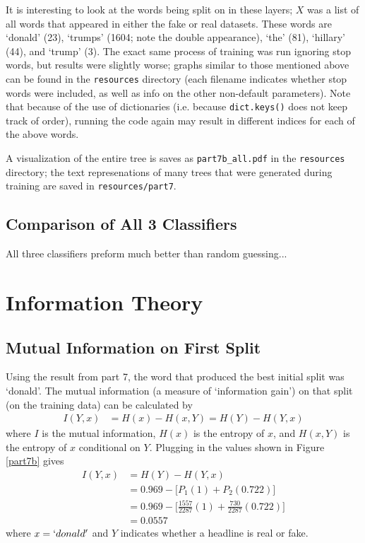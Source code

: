 \documentclass{article}
\begin{document}
   It is interesting to look at the words being split on in these layers; $X$ was a list of all words
   that appeared in either the fake or real datasets. These words are `donald' (23), `trumps' (1604; note the
   double appearance), `the' (81), `hillary' (44), and `trump' (3). The exact same process of training was run
   ignoring stop words, but results were slightly worse; graphs similar to those mentioned above can be found
   in the \texttt{resources} directory (each filename indicates whether stop words were included, as well as info
   on the other non-default parameters). Note that because of the use of dictionaries (i.e. because
   \texttt{dict.keys()} does not keep track of order), running the code again may result in different indices
   for each of the above words.


   A visualization of the entire tree is saves as \texttt{part7b\_all.pdf}
   in the \texttt{resources} directory; the text represenations of many trees that were generated during
   training are saved in \texttt{resources/part7}.

   \subsection{Comparison of All 3 Classifiers}
   All three classifiers preform much better than random guessing...


   \section{Information Theory}
   \subsection{Mutual Information on First Split}
   Using the result from part 7, the word that produced the best initial split was `donald'. The mutual information
   (a measure of `information gain') on that split (on the training data) can be calculated by
   \begin{equation*} \begin{split}
      I(Y, x)  &= H(x) - H(x, Y) = H(Y) - H(Y,x)
   \end{split} \end{equation*}
   where $I$ is the mutual information, $H(x)$ is the entropy of $x$, and $H(x, Y)$ is the entropy of $x$ conditional
   on $Y$.
   Plugging in the values shown in Figure \ref{part7b} gives
   \begin{equation*} \begin{split}
      I(Y, x)  &= H(Y) - H(Y,x) \\
               &= 0.969 - \bigg[ P_1 (1) + P_2 (0.722)  \bigg] \\
               &= 0.969 - \bigg[ \frac{1557}{2287} (1) + \frac{730}{2287} (0.722)  \bigg] \\
               &= 0.0557
   \end{split} \end{equation*}
   where $x = `donald'$ and $Y$ indicates whether a headline is real or fake.
\end{document}
